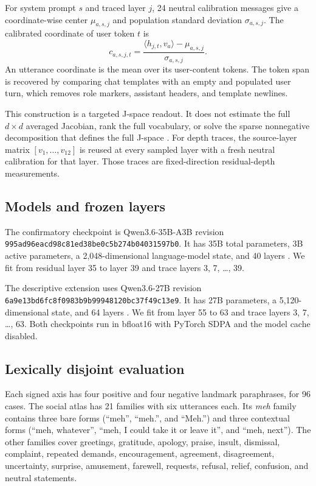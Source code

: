 \documentclass[10pt]{article}
\newcommand{\moemodel}{Qwen3.6-35B-A3B}
\newcommand{\densemodel}{Qwen3.6-27B}
\newcommand{\code}[1]{\texttt{#1}}
\begin{document}
For system prompt $s$ and traced layer $j$, 24 neutral calibration messages
give a coordinate-wise center $\mu_{a,s,j}$ and population standard deviation
$\sigma_{a,s,j}$. The calibrated coordinate of user token $t$ is
\begin{equation}
  c_{a,s,j,t} =
  \frac{\langle h_{j,t},v_a\rangle-\mu_{a,s,j}}
       {\sigma_{a,s,j}}.
\end{equation}
An utterance coordinate is the mean over its user-content tokens. The token
span is recovered by comparing chat templates with an empty and populated user
turn, which removes role markers, assistant headers, and template newlines.

This construction is a targeted J-space readout. It does not estimate the full
$d\times d$ averaged Jacobian, rank the full vocabulary, or solve the sparse
nonnegative decomposition that defines the full J-space
\cite{gurnee2026verbalizable}. For depth traces, the source-layer matrix
$[v_1,\ldots,v_{12}]$ is reused at every sampled layer with a fresh neutral
calibration for that layer. Those traces are fixed-direction residual-depth
measurements.

\subsection{Models and frozen layers}

The confirmatory checkpoint is \moemodel{} revision
\code{995ad96eacd98c81ed38be0c5b274b04031597b0}. It has 35B total parameters,
3B active parameters, a 2,048-dimensional language-model state, and 40 layers
\cite{qwen2026moe}. We fit from residual layer 35 to layer 39 and trace layers
3, 7, \ldots, 39.

The descriptive extension uses \densemodel{} revision
\code{6a9e13bd6fc8f0983b9b99948120bc37f49c13e9}. It has 27B parameters, a
5,120-dimensional state, and 64 layers \cite{qwen2026dense}. We fit from layer
55 to 63 and trace layers 3, 7, \ldots, 63. Both checkpoints run in bfloat16
with PyTorch SDPA and the model cache disabled.

\subsection{Lexically disjoint evaluation}

Each signed axis has four positive and four negative landmark paraphrases, for
96 cases. The social atlas has 21 families with six utterances each. Its
\emph{meh} family contains three bare forms (``meh'', ``meh.'', and ``Meh.'')
and three contextual forms (``meh, whatever'', ``meh, I could take it or leave
it'', and ``meh, next''). The other families cover greetings, gratitude,
apology, praise, insult, dismissal, complaint, repeated demands,
encouragement, agreement, disagreement, uncertainty, surprise, amusement,
farewell, requests, refusal, relief, confusion, and neutral statements.
\end{document}
